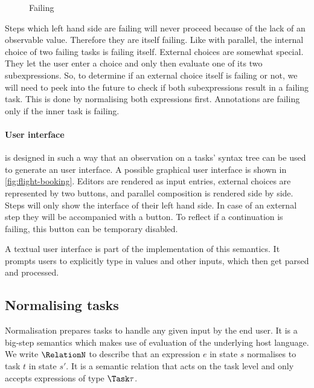 \begin{figure}[h]
  \small
  \caption{Failing} \label{fig:observation-failing}
\end{figure}

Steps which left hand side are failing will never proceed because of the lack of an observable value.
Therefore they are itself failing.
Like with parallel, the internal choice of two failing tasks is failing itself.
External choices are somewhat special.
They let the user enter a choice and only then evaluate one of its two subexpressions.
So, to determine if an external choice itself is failing or not,
we will need to peek into the future to check if both subexpressions result in a failing task.
This is done by normalising both expressions first.
Annotations are failing only if the inner task is failing.



\paragraph{User interface}

\TOPHAT is designed in such a way that an observation on a tasks' syntax tree can be used to generate an user interface.
A possible graphical user interface is shown in \autoref{fig:flight-booking}.
Editors are rendered as \HTML input entries,
external choices are represented by two buttons,
and parallel composition is rendered side by side.
Steps will only show the interface of their left hand side.
In case of an external step they will be accompanied with a button.
To reflect if a continuation is failing, this button can be temporary disabled.

A textual user interface is part of the implementation of this semantics.
It prompts users to explicitly type in values and other inputs,
which then get parsed and processed.



\subsection{Normalising tasks}
\label{sec:normalise}

Normalisation prepares tasks to handle any given input by the end user.
It is a big-step semantics which makes use of evaluation of the underlying host language.
We write $\RelationN$ to describe that
an expression $e$ in state $s$ normalises to task $t$ in state $s'$.
It is a semantic relation that acts on the task level
and only accepts expressions of type $\Task \tau$.

